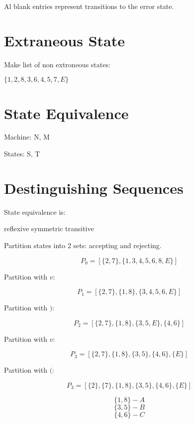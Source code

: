 \documentclass[a4paper,12pt]{article}
\begin{document}
Al blank entries represent transitions to the error state.

\section{Extraneous State}

Make list of non extroneous states:

$\{1,2,8,3,6,4,5,7,E \}$

\section{State Equivalence}

Machine: N, M

States:	S, T

\section{Destinguishing Sequences}

State equivalence is:
	
	reflexive
	symmetric
	transitive

Partition states into 2 sets: accepting and rejecting.

\[ P_{0} = [\{2,7\},\{1,3,4,5,6,8,E\}] \]

Partition with $v$:

\[ P_{1} = [\{2,7\},\{1,8\},\{3,4,5,6,E\}] \]

Partition with $)$:

\[ P_{2} = [\{2,7\},\{1,8\},\{3,5,E\},\{4,6\}] \]

Partition with $v$:

\[ P_{3} = [\{2,7\},\{1,8\},\{3,5\},\{4,6\},\{E\}] \]

Partition with $($:

\[ P_{3} = [\{2\},\{7\},\{1,8\},\{3,5\},\{4,6\},\{E\}] \]


\[ \{1,8\} - A	\]
\[ \{3,5\} - B	\]
\[ \{4,6\} - C	\]
\end{document}
